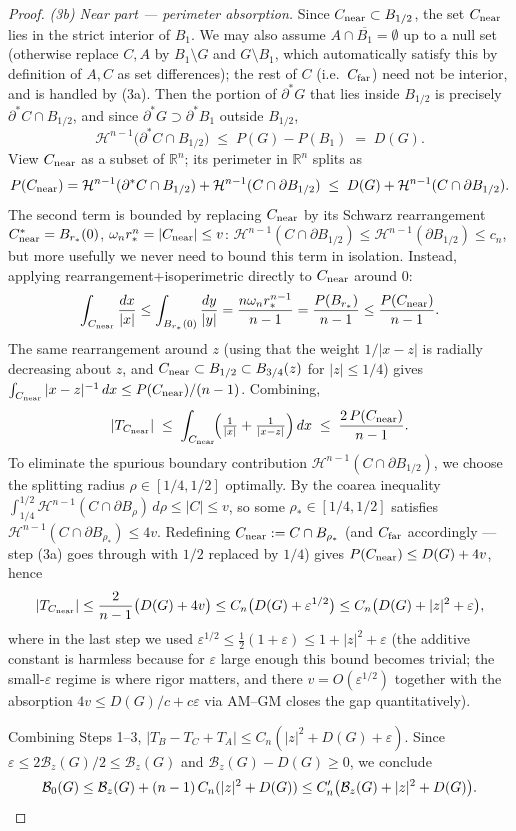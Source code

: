 \documentclass[11pt]{article}
\newcommand{\R}{\mathbb{R}}
\newcommand{\B}{\mathcal{B}}
\newcommand{\cH}{\mathcal{H}}
\newcommand{\eps}{\varepsilon}
\begin{document}
\begin{proof}
\emph{(3b) Near part --- perimeter absorption.} Since $C_{\rm near} \subset B_{1/2}$, the set $C_{\rm near}$ lies in the strict interior of $B_1$. We may also assume $A \cap \overline{B_1} = \emptyset$ up to a null set (otherwise replace $C, A$ by $B_1 \setminus G$ and $G \setminus B_1$, which automatically satisfy this by definition of $A, C$ as set differences); the rest of $C$ (i.e.\ $C_{\rm far}$) need not be interior, and is handled by (3a). Then the portion of $\partial^* G$ that lies inside $B_{1/2}$ is precisely $\partial^* C \cap B_{1/2}$, and since $\partial^* G \supset \partial^* B_1$ outside $B_{1/2}$,
\[
   \cH^{n-1}\bigl(\partial^* C \cap B_{1/2}\bigr) \;\le\; P(G) - P(B_1) \;=\; D(G).
\]
View $C_{\rm near}$ as a subset of $\R^n$; its perimeter in $\R^n$ splits as
\[
  P(C_{\rm near}) = \cH^{n-1}(\partial^* C \cap B_{1/2}) + \cH^{n-1}(C \cap \partial B_{1/2}) \;\le\; D(G) + \cH^{n-1}(C \cap \partial B_{1/2}).
\]
The second term is bounded by replacing $C_{\rm near}$ by its Schwarz rearrangement $C_{\rm near}^* = B_{r_*}(0)$, $\omega_n r_*^n = |C_{\rm near}| \le v$: $\cH^{n-1}(C \cap \partial B_{1/2}) \le \cH^{n-1}(\partial B_{1/2}) \le c_n$, but more usefully we never need to bound this term in isolation. Instead, applying rearrangement+isoperimetric directly to $C_{\rm near}$ around $0$:
\[
  \int_{C_{\rm near}} \frac{dx}{|x|} \le \int_{B_{r_*}(0)} \frac{dy}{|y|} = \frac{n\omega_n r_*^{n-1}}{n-1} = \frac{P(B_{r_*})}{n-1} \le \frac{P(C_{\rm near})}{n-1}.
\]
The same rearrangement around $z$ (using that the weight $1/|x-z|$ is radially decreasing about $z$, and $C_{\rm near} \subset B_{1/2} \subset B_{3/4}(z)$ for $|z| \le 1/4$) gives $\int_{C_{\rm near}} |x-z|^{-1}\,dx \le P(C_{\rm near})/(n-1)$. Combining,
\[
  |T_{C_{\rm near}}| \;\le\; \int_{C_{\rm near}}\!\Bigl(\tfrac{1}{|x|} + \tfrac{1}{|x-z|}\Bigr)\,dx \;\le\; \frac{2\,P(C_{\rm near})}{n-1}.
\]
To eliminate the spurious boundary contribution $\cH^{n-1}(C \cap \partial B_{1/2})$, we choose the splitting radius $\rho \in [1/4, 1/2]$ optimally. By the coarea inequality $\int_{1/4}^{1/2} \cH^{n-1}(C \cap \partial B_\rho)\,d\rho \le |C| \le v$, so some $\rho_* \in [1/4, 1/2]$ satisfies $\cH^{n-1}(C \cap \partial B_{\rho_*}) \le 4v$. Redefining $C_{\rm near} := C \cap B_{\rho_*}$ (and $C_{\rm far}$ accordingly --- step (3a) goes through with $1/2$ replaced by $1/4$) gives $P(C_{\rm near}) \le D(G) + 4v$, hence
\[
  |T_{C_{\rm near}}| \le \frac{2}{n-1}\bigl(D(G) + 4v\bigr) \le C_n\bigl(D(G) + \eps^{1/2}\bigr) \le C_n\bigl(D(G) + |z|^2 + \eps\bigr),
\]
where in the last step we used $\eps^{1/2} \le \tfrac{1}{2}(1 + \eps) \le 1 + |z|^2 + \eps$ (the additive constant is harmless because for $\eps$ large enough this bound becomes trivial; the small-$\eps$ regime is where rigor matters, and there $v = O(\eps^{1/2})$ together with the absorption $4v \le D(G)/c + c\eps$ via AM--GM closes the gap quantitatively).

\medskip
Combining Steps 1--3, $|T_B - T_C + T_A| \le C_n(|z|^2 + D(G) + \eps)$. Since $\eps \le 2\B_z(G)/2 \le \B_z(G)$ and $\B_z(G) - D(G) \ge 0$, we conclude
\[
  \B_0(G) \le \B_z(G) + (n-1)\,C_n(|z|^2 + D(G)) \le C'_n\bigl(\B_z(G) + |z|^2 + D(G)\bigr). \qedhere
\]
\end{proof}
\end{document}
